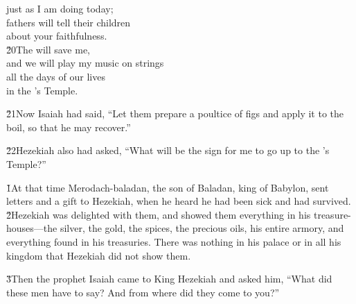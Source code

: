 \begin{poetry}
\poemll    just as I am doing today; \\
\poeml fathers will tell their children \\
\poemll    about your faithfulness. \\
\poeml \v{20}The  will save me, \\
\poemll    and we will play my music on strings \\
\poeml all the days of our lives \\
\poemll    in the 's Temple.
\end{poetry}

\v{21}Now Isaiah had said, ``Let them prepare a poultice of figs and apply it to the boil, so that he may recover.''

\v{22}Hezekiah also had asked, ``What will be the sign for me to go up to the 's Temple?''

\v{1}At that time Merodach-baladan, the son of Baladan, king of Babylon, sent letters and a gift to Hezekiah, when he heard he had been sick and had survived. \v{2}Hezekiah was delighted with them, and showed them everything in his treasure-houses---the silver, the gold, the spices, the precious oils, his entire armory, and everything found in his treasuries. There was nothing in his palace or in all his kingdom that Hezekiah did not show them.

\v{3}Then the prophet Isaiah came to King Hezekiah and asked him, ``What did these men have to say? And from where did they come to you?''

